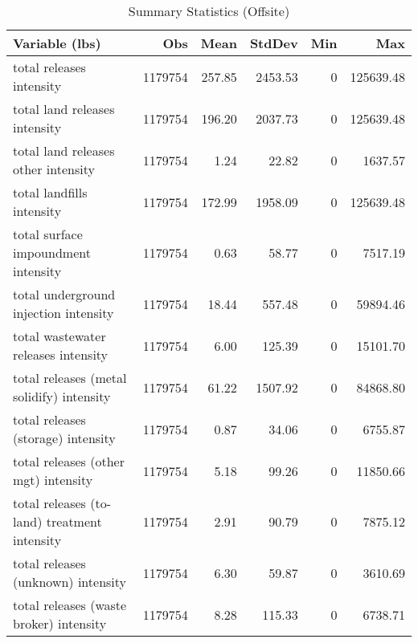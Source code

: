 \begin{table}[H]
    \centering
    \caption{Summary Statistics (Offsite)}
    \label{tab:sumstat-offsite}
    \begin{tabular}{lrrrrr}
        \toprule \toprule
        Variable (lbs)                               & Obs     & Mean   & StdDev  & Min & Max       \\ \midrule
        total releases intensity                     & 1179754 & 257.85 & 2453.53 & 0   & 125639.48 \\
        total land releases intensity                & 1179754 & 196.20 & 2037.73 & 0   & 125639.48 \\
        total land releases other intensity          & 1179754 & 1.24   & 22.82   & 0   & 1637.57   \\
        total landfills intensity                    & 1179754 & 172.99 & 1958.09 & 0   & 125639.48 \\
        total surface impoundment intensity          & 1179754 & 0.63   & 58.77   & 0   & 7517.19   \\
        total underground injection intensity        & 1179754 & 18.44  & 557.48  & 0   & 59894.46  \\
        total wastewater releases intensity          & 1179754 & 6.00   & 125.39  & 0   & 15101.70  \\
        total releases (metal solidify) intensity    & 1179754 & 61.22  & 1507.92 & 0   & 84868.80  \\
        total releases (storage) intensity           & 1179754 & 0.87   & 34.06   & 0   & 6755.87   \\
        total releases (other mgt) intensity         & 1179754 & 5.18   & 99.26   & 0   & 11850.66  \\
        total releases (to-land) treatment intensity & 1179754 & 2.91   & 90.79   & 0   & 7875.12   \\
        total releases (unknown) intensity           & 1179754 & 6.30   & 59.87   & 0   & 3610.69   \\
        total releases (waste broker) intensity      & 1179754 & 8.28   & 115.33  & 0   & 6738.71   \\ \bottomrule\bottomrule
    \end{tabular}
\end{table}
